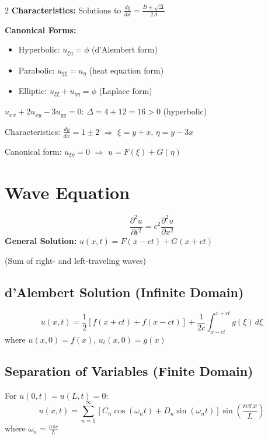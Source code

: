 \documentclass[10pt,a4paper]{article}
\begin{document}
\begin{multicols}{2}
\textbf{Characteristics:} Solutions to $\displaystyle\frac{dy}{dx} = \frac{B \pm \sqrt{\Delta}}{2A}$

\textbf{Canonical Forms:}
\begin{itemize}
    \item Hyperbolic: $u_{\xi\eta} = \phi$ (d'Alembert form)
    \item Parabolic: $u_{\xi\xi} = u_\eta$ (heat equation form)
    \item Elliptic: $u_{\xi\xi} + u_{\eta\eta} = \phi$ (Laplace form)
\end{itemize}

\begin{example}
$u_{xx} + 2u_{xy} - 3u_{yy} = 0$: $\Delta = 4 + 12 = 16 > 0$ (hyperbolic)

Characteristics: $\frac{dy}{dx} = 1 \pm 2$ $\Rightarrow$ $\xi = y + x$, $\eta = y - 3x$

Canonical form: $u_{\xi\eta} = 0$ $\Rightarrow$ $u = F(\xi) + G(\eta)$
\end{example}

\section{Wave Equation}

\begin{keyformula}
\begin{equation}
\frac{\partial^2 u}{\partial t^2} = c^2 \frac{\partial^2 u}{\partial x^2}
\end{equation}
\textbf{General Solution:} $u(x,t) = F(x-ct) + G(x+ct)$

(Sum of right- and left-traveling waves)
\end{keyformula}

\subsection{d'Alembert Solution (Infinite Domain)}
\begin{equation}
u(x,t) = \frac{1}{2}[f(x+ct) + f(x-ct)] + \frac{1}{2c}\int_{x-ct}^{x+ct} g(\xi)\,d\xi
\end{equation}
where $u(x,0) = f(x)$, $u_t(x,0) = g(x)$

\subsection{Separation of Variables (Finite Domain)}
For $u(0,t) = u(L,t) = 0$:
\begin{equation}
u(x,t) = \sum_{n=1}^{\infty}\left[C_n\cos(\omega_n t) + D_n\sin(\omega_n t)\right]\sin\left(\frac{n\pi x}{L}\right)
\end{equation}
where $\omega_n = \frac{n\pi c}{L}$


\end{multicols}
\end{document}
